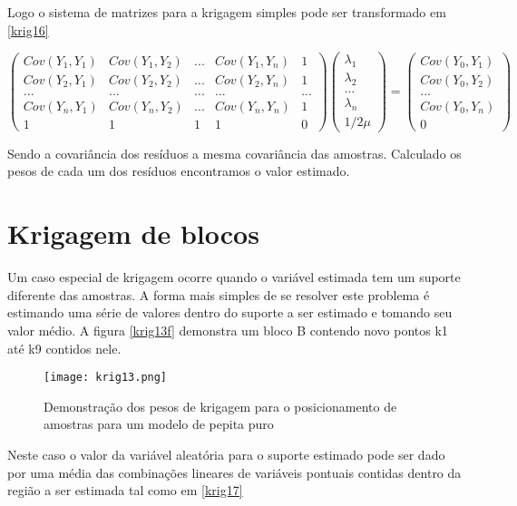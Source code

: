 Logo o sistema de matrizes para  a krigagem simples pode ser transformado em \eqref{krig16}

\begin{equation}\label{krig16}
\begin{pmatrix}
Cov(Y_{1},Y_{1})&Cov(Y_{1},Y_{2})& ... & Cov(Y_{1},Y_{n})& 1\\ 
Cov(Y_{2},Y_{1})&Cov(Y_{2},Y_{2})& ... & Cov(Y_{2},Y_{n})& 1 \\ 
...&...& ...&... & ...\\
Cov(Y_{n},Y_{1})&Cov(Y_{n},Y_{2})& ... & Cov(Y_{n},Y_{n})& 1\\
1&1& 1&1& 0
\end{pmatrix} 
\begin{pmatrix}
\lambda _{1}\\ 
\lambda _{2}\\ 
...\\ 
\lambda _{n}\\
1/2\mu
\end{pmatrix}=\begin{pmatrix}
Cov(Y_{0}, Y_{1})\\ 
Cov(Y_{0}, Y_{2})\\  
...\\
Cov(Y_{0}, Y_{n})\\
0
\end{pmatrix}
\end{equation}

Sendo a covariância dos resíduos a mesma covariância das amostras. Calculado os pesos de cada um dos resíduos encontramos o valor estimado.

\section{Krigagem de blocos}

Um caso especial de krigagem ocorre quando o variável estimada tem um suporte diferente das amostras. A forma mais simples de se resolver este problema é estimando uma série de valores dentro do suporte a ser estimado e tomando seu valor médio. A figura \eqref{krig13f} demonstra um bloco B contendo novo pontos k1 até k9 contidos nele. 

\begin{figure}[H]
	\centering
	\texttt{[image: krig13.png]}
	\caption{Demonstração dos pesos de krigagem para o posicionamento de amostras para um modelo de pepita puro}
	\label{krig13f}
\end{figure}

Neste caso o valor da variável aleatória para o suporte estimado pode ser dado por uma média das combinações lineares de variáveis pontuais contidas dentro da região a ser estimada tal como em \eqref{krig17}

